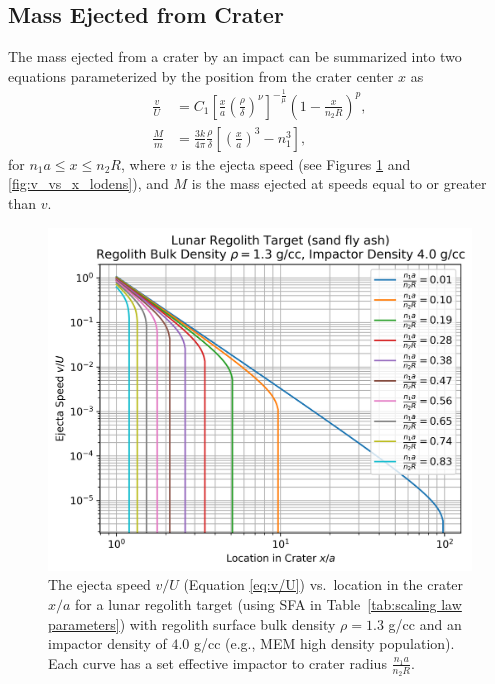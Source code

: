 \documentclass{article}
\begin{document}
\subsection{Mass Ejected from Crater}\label{ssec:Mass Ejected from Crater}

The mass ejected from a crater by an impact can be summarized into two equations parameterized by the position from the crater center $x$ as
\begin{align}\label{eq:v/U}
\frac{v}{U} &= C_1\left[\frac{x}{a}\left(\frac{\rho}{\delta}\right)^\nu\right]^{-\frac{1}{\mu}}\left(1 - \frac{x}{n_2 R}\right)^p,\\
\frac{M}{m} &= \frac{3k}{4\pi}\frac{\rho}{\delta}\left[\left(\frac{x}{a}\right)^3-n_1^3\right],\label{eq:M_HH11}
\end{align}
for $n_1 a \le x \le n_2 R$, where $v$ is the ejecta speed (see Figures \ref{fig:v_vs_x_hidens} and \ref{fig:v_vs_x_lodens}), and $M$ is the mass ejected at speeds equal to or greater than $v$.



\begin{figure}[!htb]
	\centering
	\includegraphics[width=0.65\linewidth]{v_vs_x_hidens.png}
	\caption{The ejecta speed $v/U$ (Equation \eqref{eq:v/U}) vs.\ location in the crater $x/a$ for a lunar regolith target (using SFA in Table~\ref{tab:scaling law parameters}) with regolith surface bulk density $\rho = 1.3$ g/cc and an impactor density of $4.0$ g/cc (e.g., MEM high density population). Each curve has a set effective impactor to crater radius $\frac{n_1 a}{n_2 R}$.}\label{fig:v_vs_x_hidens}
\end{figure}
\end{document}
